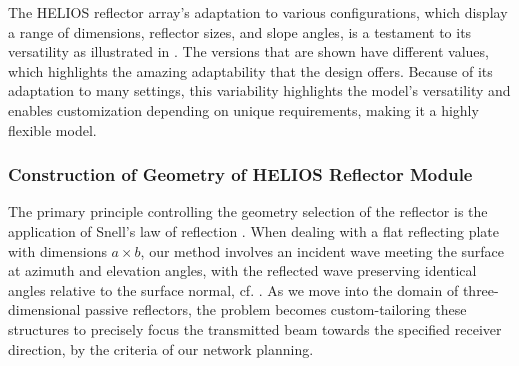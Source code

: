 The HELIOS reflector array's adaptation to various configurations, which display a range of dimensions, reflector sizes, and slope angles, is a testament to its versatility as illustrated in . The versions that are shown have different values, which highlights the amazing adaptability that the design offers. Because of its adaptation to many settings, this variability highlights the model's versatility and enables customization depending on unique requirements, making it a highly flexible model.
\subsubsection{Construction of Geometry of HELIOS Reflector Module}
The primary principle controlling the geometry selection of the reflector is the application of Snell's law of reflection \cite{7728465}. When dealing with a flat reflecting plate with dimensions $a \times b$, our method involves an incident wave meeting the surface at azimuth and elevation angles, with the reflected wave preserving identical angles relative to the surface normal, cf. . As we move into the domain of three-dimensional passive reflectors, the problem becomes custom-tailoring these structures to precisely focus the transmitted beam towards the specified receiver direction, by the criteria of our network planning.

